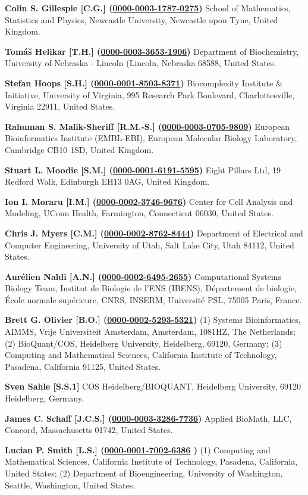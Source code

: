 \documentclass{sbml-paper}
\newcommand{\orcid}[1]{\href{https://orcid.org/#1}{#1}}
\begin{document}
\textbf{Colin S. Gillespie [C.G.] (\orcid{0000-0003-1787-0275})} School of Mathematics, Statistics and Physics, Newcastle University, Newcastle upon Tyne, United Kingdom.

\textbf{Tomáš Helikar [T.H.] (\orcid{0000-0003-3653-1906})} Department of Biochemistry, University of Nebraska - Lincoln (Lincoln, Nebraska 68588, United States.

\textbf{Stefan Hoops [S.H.] (\orcid{0000-0001-8503-8371})} Biocomplexity Institute \& Initiative, University of Virginia, 995 Research Park Boulevard, Charlottesville, Virginia 22911, United States.

\textbf{Rahuman S. Malik-Sheriff [R.M.-S.] (\orcid{0000-0003-0705-9809})} European Bioinformatics Institute (EMBL-EBI), European Molecular Biology Laboratory, Cambridge CB10 1SD, United Kingdom.

\textbf{Stuart L. Moodie [S.M.] (\orcid{0000-0001-6191-5595})} Eight Pillars Ltd, 19 Redford Walk, Edinburgh EH13 0AG, United Kingdom.

\textbf{Ion I. Moraru [I.M.] (\orcid{0000-0002-3746-9676})} Center for Cell Analysis and Modeling, UConn Health, Farmington, Connecticut 06030, United States.

\textbf{Chris J. Myers [C.M.] (\orcid{0000-0002-8762-8444})} Department of Electrical and Computer Engineering, University of Utah, Salt Lake City, Utah 84112, United States.

\textbf{Aurélien Naldi [A.N.] (\orcid{0000-0002-6495-2655})} Computational Systems Biology Team, Institut de Biologie de l’ENS (IBENS), Département de biologie, École normale supérieure, CNRS, INSERM, Université PSL, 75005 Paris, France.

\textbf{Brett G. Olivier [B.O.] (\orcid{0000-0002-5293-5321})} (1) Systems Bioinformatics, AIMMS, Vrije Universiteit Amsterdam, Amsterdam, 1081HZ, The Netherlands; (2) BioQuant/COS, Heidelberg University, Heidelberg, 69120, Germany; (3) Computing and Mathematical Sciences, California Institute of Technology, Pasadena, California 91125, United States.

\textbf{Sven Sahle [S.S.1]} COS Heidelberg/BIOQUANT,  Heidelberg University, 69120 Heidelberg, Germany.

\textbf{James C. Schaff [J.C.S.] (\orcid{0000-0003-3286-7736})} Applied BioMath, LLC, Concord, Massachusetts 01742, United States.

\textbf{Lucian P. Smith [L.S.] (\orcid{0000-0001-7002-6386} )} (1) Computing and Mathematical Sciences, California Institute of Technology, Pasadena, California, United States; (2) Department of Bioengineering, University of Washington, Seattle, Washington, United States.
\end{document}
